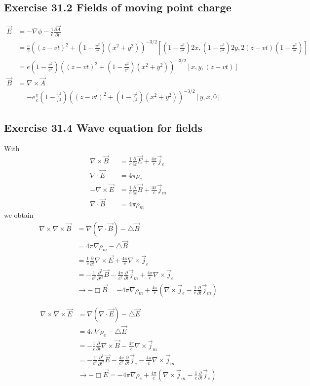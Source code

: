 \documentclass[../main.tex]{subfiles}
\begin{document}
\subsection{Exercise 31.2 Fields of moving point charge}
\begin{align}
	\vec{E}&=-\nabla\phi-\frac{1}{c}\frac{\partial\vec{A}}{\partial t}\\
	&=\frac{e}{2}\left((z-vt)^2+(1-\frac{v^2}{c^2})(x^2+y^2)\right)^{-3/2}[(1-\frac{v^2}{c^2})2x,(1-\frac{v^2}{c^2})2y,2(z-vt)(1-\frac{v^2}{c^2})]\\
	&=e(1-\frac{v^2}{c^2})\left((z-vt)^2+(1-\frac{v^2}{c^2})(x^2+y^2)\right)^{-3/2}[x,y,(z-vt)]\\
	\vec{B}&=\nabla\times\vec{A}\\
	&=-e\frac{v}{c}(1-\frac{v^2}{c^2})\left((z-vt)^2+(1-\frac{v^2}{c^2})(x^2+y^2)\right)^{-3/2}[y,x,0]
\end{align}

\subsection{Exercise 31.4 Wave equation for fields}
With
\begin{align}
\nabla\times\vec{B}&=\frac{1}{c}\frac{\partial}{\partial t}\vec{E}+\frac{4\pi}{c}\vec{j}_e\\
\nabla\cdot\vec{E}&=4\pi\rho_e\\
-\nabla\times\vec{E}&=\frac{1}{c}\frac{\partial}{\partial t}\vec{B}+\frac{4\pi}{c}\vec{j}_m\\
\nabla\cdot\vec{B}&=4\pi\rho_m
\end{align}
we obtain
\begin{align}
\nabla\times\nabla\times\vec{B}
&=\nabla(\nabla\cdot\vec{B})-\triangle\vec{B}\\
&=4\pi\nabla\rho_m-\triangle\vec{B}\\
&=\frac{1}{c}\frac{\partial}{\partial t}\nabla\times\vec{E}+\frac{4\pi}{c}\nabla\times\vec{j}_e\\
&=-\frac{1}{c^2}\frac{\partial^2}{\partial t^2}\vec{B}-\frac{4\pi}{c^2}\frac{\partial}{\partial t}\vec{j}_m+\frac{4\pi}{c}\nabla\times\vec{j}_e\\
&\rightarrow-\Box\vec{B}=-4\pi\nabla\rho_m+\frac{4\pi}{c}(\nabla\times\vec{j}_e-\frac{1}{c}\frac{\partial}{\partial t}\vec{j}_m)
\end{align}

\begin{align}
\nabla\times\nabla\times\vec{E}
&=\nabla(\nabla\cdot\vec{E})-\triangle\vec{E}\\
&=4\pi\nabla\rho_e-\triangle\vec{E}\\
&=-\frac{1}{c}\frac{\partial}{\partial t}\nabla\times\vec{B}-\frac{4\pi}{c}\nabla\times\vec{j}_m\\
&=-\frac{1}{c^2}\frac{\partial^2}{\partial t^2}\vec{E}-\frac{4\pi}{c^2}\frac{\partial}{\partial t}\vec{j}_e-\frac{4\pi}{c}\nabla\times\vec{j}_m\\
&\rightarrow-\Box\vec{E}=-4\pi\nabla\rho_e+\frac{4\pi}{c}(\nabla\times\vec{j}_m-\frac{1}{c}\frac{\partial}{\partial t}\vec{j}_e)
\end{align}
\end{document}

